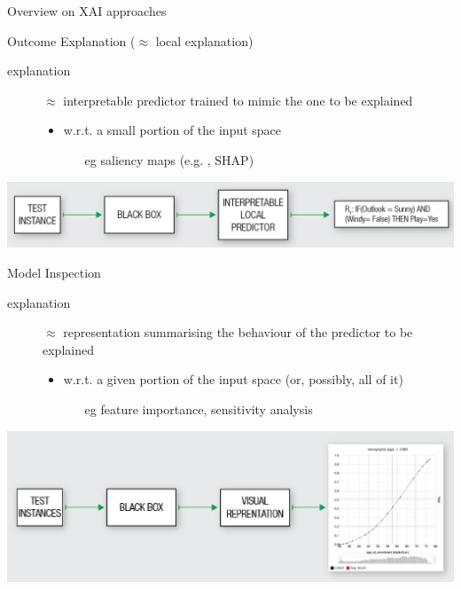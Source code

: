 \documentclass[presentation]{beamer}\mode<presentation>{\usetheme{AMSBolognaFC}}
\begin{document}
\begin{frame}[allowframebreaks]{Overview on XAI approaches}
    \framebreak

    \begin{block}{Outcome Explanation ($\approx$ local explanation)}
        \begin{description}
            \item[explanation] $\approx$ interpretable predictor trained to mimic the one to be explained
            \begin{itemize}
                \item w.r.t. a small portion of the input space
                \begin{itemize}
                    \item[eg] saliency maps (e.g. \lime{}, SHAP)
                \end{itemize}
            \end{itemize}
        \end{description}
    \end{block}
    \begin{center}
        \includegraphics[width=.8\linewidth]{figures/outcome-explanation.png}
    \end{center}

    \framebreak

    \begin{block}{Model Inspection}
        \begin{description}
            \item[explanation] $\approx$ representation summarising the behaviour of the predictor to be explained 
            \begin{itemize}
                \item w.r.t. a given portion of the input space (or, possibly, all of it)
                \begin{itemize}
                    \item[eg] feature importance, sensitivity analysis
                \end{itemize}
            \end{itemize}
        \end{description}
    \end{block}
    \begin{center}
        \includegraphics[width=.8\linewidth]{figures/model-inspection.png}
    \end{center}


\end{frame}
\end{document}
